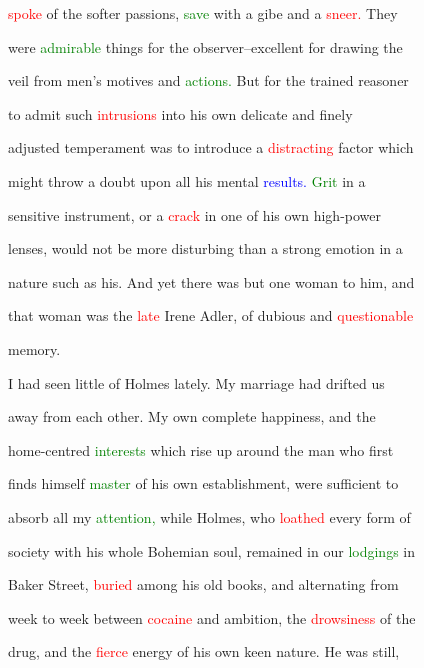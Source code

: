  \textcolor{red}{spoke} of the softer \textcolor{BurntOrange}{passions,} \textcolor{green}{save} with a gibe and a \textcolor{red}{sneer.} They

 were \textcolor{green}{admirable} things for the observer--excellent for drawing the

 veil from men's motives and \textcolor{green}{actions.} But for the trained reasoner

 to admit such \textcolor{red}{intrusions} into his own delicate and finely

 adjusted temperament was to introduce a \textcolor{red}{distracting} factor which

 might throw a \textcolor{BurntOrange}{doubt} upon all his mental \textcolor{blue}{results.} \textcolor{green}{Grit} in a

 sensitive instrument, or a \textcolor{red}{crack} in one of his own high-power

 lenses, would not be more disturbing than a strong emotion in a

 nature such as his. And yet there was but one woman to him, and

 that woman was the \textcolor{red}{late} Irene Adler, of \textcolor{BurntOrange}{dubious} and \textcolor{red}{questionable}

 memory.



 I had seen little of Holmes lately. My \textcolor{BurntOrange}{marriage} had drifted us

 away from each other. My own complete \textcolor{BurntOrange}{happiness,} and the

 home-centred \textcolor{green}{interests} which rise up around the man who first

 finds himself \textcolor{green}{master} of his own establishment, were sufficient to

 absorb all my \textcolor{green}{attention,} while Holmes, who \textcolor{red}{loathed} every form of

 society with his whole Bohemian soul, remained in our \textcolor{green}{lodgings} in

 Baker Street, \textcolor{red}{buried} among his old books, and alternating from

 week to week between \textcolor{red}{cocaine} and \textcolor{BurntOrange}{ambition,} the \textcolor{red}{drowsiness} of the

 drug, and the \textcolor{red}{fierce} energy of his own keen nature. He was still,

